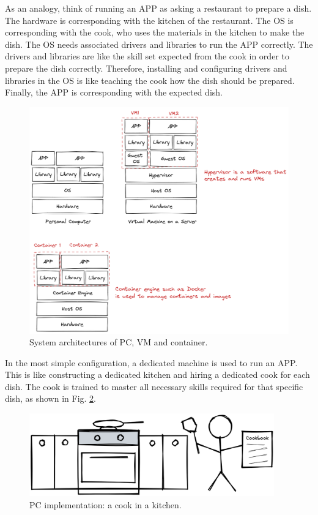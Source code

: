 As an analogy, think of running an APP as asking a restaurant to prepare a dish. The hardware is corresponding with the kitchen of the restaurant. The OS is corresponding with the cook, who uses the materials in the kitchen to make the dish. The OS needs associated drivers and libraries to run the APP correctly. The drivers and libraries are like the skill set expected from the cook in order to prepare the dish correctly. Therefore, installing and configuring drivers and libraries in the OS is like teaching the cook how the dish should be prepared. Finally, the APP is corresponding with the expected dish.

\begin{figure}
	\centering
	\includegraphics[width=350pt]{chapters/ch-virtualization-and-containerization/figures/pcvmcontainerstructure.png}
	\caption{System architectures of PC, VM and container.} \label{ch:vac:fig:pcvmcontainersructure}
\end{figure}

In the most simple configuration, a dedicated machine is used to run an APP. This is like constructing a dedicated kitchen and hiring a dedicated cook for each dish. The cook is trained to master all necessary skills required for that specific dish, as shown in Fig. \ref{ch:vac:fig:acookinakitchen}.
\begin{figure}
	\centering
	\includegraphics[width=300pt]{chapters/ch-virtualization-and-containerization/figures/acookinakitchen.png}
	\caption{PC implementation: a cook in a kitchen.} \label{ch:vac:fig:acookinakitchen}
\end{figure}

